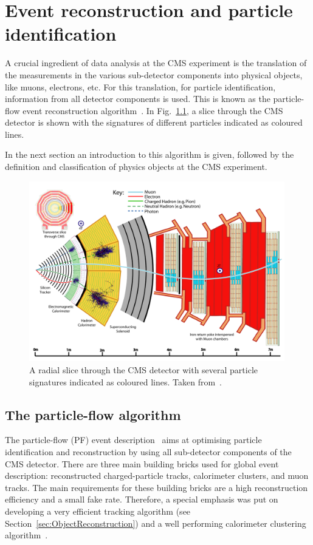 \chapter{Event reconstruction and particle identification}
A crucial ingredient of data analysis at the CMS experiment is the translation of the measurements in the various sub-detector components into physical objects, like muons, electrons, etc.
For this translation, \ie for particle identification, information from all detector components is used.
This is known as the particle-flow event reconstruction algorithm~\cite{CMS-PAS-PFT-09-001}.
In Fig.~\ref{fig:CMSslice}, a slice through the CMS detector is shown with the signatures of different particles indicated as coloured lines.

In the next section an introduction to this algorithm is given, followed by the definition and classification of physics objects at the CMS experiment.
\begin{figure}[!t]
  \centering
      \includegraphics[width=0.99\textwidth]{figures/experiment/ObjectReconstruction/slice_white_smaller_size.pdf}
  \caption{A radial slice through the CMS detector with several particle signatures indicated as coloured lines. Taken from~\cite{bib:Signatures_figure}.}  
  \label{fig:CMSslice}
\end{figure}


\section{The particle-flow algorithm}
\label{sec:PFalgorithm}
The particle-flow (PF) event description~\cite{CMS-PAS-PFT-09-001} aims at optimising particle identification and reconstruction by using all sub-detector components of the CMS detector.
There are three main building bricks used for global event description: reconstructed charged-particle tracks, calorimeter clusters, and muon tracks.
The main requirements for these building bricks are a high reconstruction efficiency and a small fake rate.
Therefore, a special emphasis was put on developing a very efficient tracking algorithm (see Section~\ref{sec:ObjectReconstruction}) and a well performing calorimeter clustering algorithm~\cite{CMS-PAS-PFT-09-001}. 

